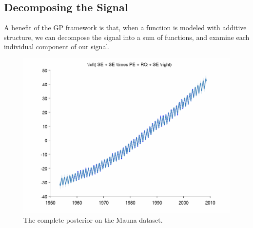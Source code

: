 \documentclass[twoside]{article}
\theoremstyle{definition}
\theoremstyle{remark}
\numberwithin{equation}{section}
\numberwithin{thm}{section}
\begin{document}






\subsection{Decomposing the Signal}

A benefit of the GP framework is that, when a function is modeled with additive structure, we can decompose the signal into a sum of functions, and examine each individual component of our signal.

\begin{figure}
\includegraphics[width=\columnwidth]{../figures/decomposition/mauna_test_all}
\caption{The complete posterior on the Mauna dataset.}
\end{figure}
\end{document}
